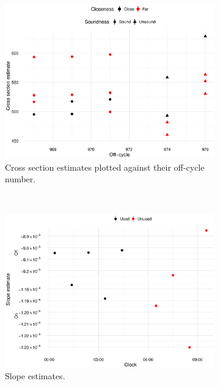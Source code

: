 \documentclass[reprint]{revtex4-1}
\newcommand{\scl}{.43}
\begin{document}
\begin{figure}
\begin{subfigure}{.5\textwidth}
\includegraphics[scale=\scl]{img/Cross-Section_all.eps}
\caption{Cross section estimates plotted against their off-cycle number.\label{fig:CS-all}}
\end{subfigure}~
\begin{subfigure}{.5\textwidth}
\includegraphics[scale=\scl]{img/Slopes-2012_big.eps}
\caption{Slope estimates.\label{fig:Slopes}}
\end{subfigure}
\begin{subfigure}{.5\textwidth}

\end{subfigure}
\end{figure}
\end{document}
